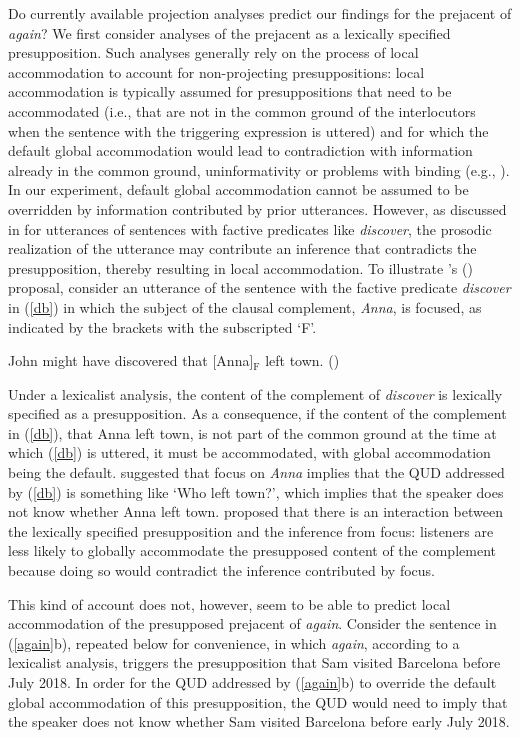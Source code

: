 \documentclass[a4paper,12pt]{article}
\newcommand{\6}{\mbox{$[\hspace*{-.6mm}[$}}
\newcommand{\9}{\mbox{$]\hspace*{-.6mm}]$}}
\newcommand{\citetpos}[1]{\citeauthor{#1}'s (\citeyear{#1})}
\begin{document}
Do currently available projection analyses predict our findings for the prejacent of {\em again}? We first consider analyses of the prejacent as a lexically specified presupposition. Such analyses generally rely on the process of local accommodation to account for non-projecting presuppositions: local accommodation is typically assumed for presuppositions that need to be accommodated (i.e., that are not in the common ground of the interlocutors when the sentence with the triggering expression is uttered) and for which the default global accommodation would lead to contradiction with information already in the common ground, uninformativity or problems with binding (e.g., \citealt{heim83,vds92}). In our experiment, default global accommodation cannot be assumed to be overridden by information contributed by prior utterances. However, as discussed in \citealt{djaerv-bacovcin-salt27} for utterances of sentences with factive predicates like {\em discover}, the prosodic realization of the utterance may contribute an inference that contradicts the presupposition, thereby resulting in local accommodation. To illustrate \citetpos{djaerv-bacovcin-salt27} proposal, consider an utterance of the sentence with the factive predicate {\em discover} in (\ref{db}) in which the subject of the clausal complement, {\em Anna}, is focused, as indicated by the brackets with the subscripted `F'.

\begin{exe}
\ex\label{db} John might have discovered that [Anna]$_{\mbox{F}}$ left town. \hfill (\citealt[129]{djaerv-bacovcin-salt27})
\end{exe}
Under a lexicalist analysis, the content of the complement of {\em discover}  is lexically specified as a presupposition. As a consequence, if the content of the complement in (\ref{db}), that Anna left town, is not part of the common ground at the time at which (\ref{db}) is uttered, it must be accommodated, with global accommodation being the default. \citet{djaerv-bacovcin-salt27} suggested that focus on {\em Anna} implies that the QUD addressed by (\ref{db}) is something like `Who left town?', which implies that the speaker does not know whether Anna left town. \citet{djaerv-bacovcin-salt27} proposed that there is an interaction between the lexically specified presupposition and the inference from focus: listeners are less likely to globally accommodate the presupposed content of the complement because doing so would contradict the inference contributed by focus.

This kind of account does not, however, seem to be able to predict local accommodation of the presupposed prejacent of {\em again}. Consider the sentence in (\ref{again}b), repeated below for convenience, in which {\em again}, according to a lexicalist analysis, triggers the presupposition that Sam visited Barcelona before July 2018. In order for the QUD addressed by (\ref{again}b) to override the default global accommodation of this presupposition, the QUD would need to imply that the speaker does not know whether Sam visited Barcelona before early July 2018.  
\end{document}
